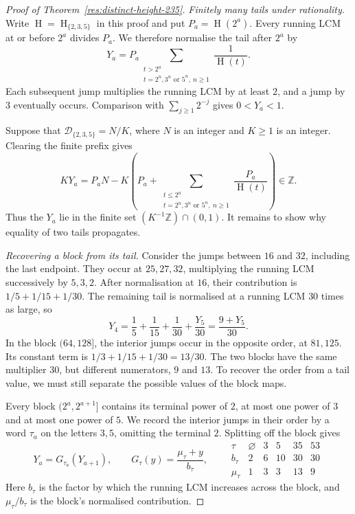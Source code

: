 \documentclass[11pt]{article}
\newcommand{\hgt}{\operatorname{H}}
\begin{document}
\begin{proof}[Proof of Theorem~\ref{res:distinct-height-235}]
\emph{Finitely many tails under rationality.}
Write $\hgt=\hgt_{\{2,3,5\}}$ in this proof and put $P_a=\hgt(2^a)$.
Every running LCM at or before $2^a$ divides $P_a$. We therefore normalise
the tail after $2^a$ by
\begin{equation}\label{eq:five-tail}
 Y_a=P_a\sum_{\substack{t>2^a\\t=2^n,3^n\text{ or }5^n,\ n\ge1}}
                   \frac1{\hgt(t)}.
\end{equation}
Each subsequent jump multiplies the running LCM by at least $2$, and a jump
by $3$ eventually occurs. Comparison with $\sum_{j\ge1}2^{-j}$ gives
$0<Y_a<1$.

Suppose that $\mathcal D_{\{2,3,5\}}=N/K$, where $N$ is an integer and
$K\ge1$ is an integer. Clearing the finite prefix gives
\[
 KY_a=P_aN-K\left(P_a+
        \sum_{\substack{t\le2^a\\t=2^n,3^n\text{ or }5^n,\ n\ge1}}
                 \frac{P_a}{\hgt(t)}\right)\in\mathbb Z.
\]
Thus the $Y_a$ lie in the finite set $(K^{-1}\mathbb Z)\cap(0,1)$.
It remains to show why equality of two tails propagates.

\medskip
\emph{Recovering a block from its tail.}
Consider the jumps between $16$ and $32$, including the last endpoint.
They occur at $25,27,32$, multiplying the running LCM successively by $5,3,2$.
After normalisation at $16$, their contribution is
$1/5+1/15+1/30$. The remaining tail is normalised at a running LCM $30$
times as large, so
\[
 Y_4=\frac15+\frac1{15}+\frac1{30}+\frac{Y_5}{30}
     =\frac{9+Y_5}{30}.
\]
In the block $(64,128]$, the interior jumps occur in the opposite order,
at $81,125$. Its constant term is $1/3+1/15+1/30=13/30$.
The two blocks have the same multiplier $30$, but different numerators,
$9$ and $13$. To recover the order from a tail value, we must still
separate the possible values of the block maps.

Every block $(2^a,2^{a+1}]$ contains its terminal power of $2$, at most
one power of $3$ and at most one power of $5$. We record the interior
jumps in their order by a word $\tau_a$ on the letters $3,5$, omitting
the terminal $2$. Splitting off the block gives
\begin{equation}\label{eq:five-maps}
 Y_a=G_{\tau_a}(Y_{a+1}),\qquad
 G_\tau(y)=\frac{\mu_\tau+y}{b_\tau},\qquad
 \begin{array}{c|ccccc}
 \tau&\varnothing&3&5&35&53\\\hline
 b_\tau&2&6&10&30&30\\
 \mu_\tau&1&3&3&13&9
 \end{array}
\end{equation}
Here $b_\tau$ is the factor by which the running LCM increases across the
block, and $\mu_\tau/b_\tau$ is the block's normalised contribution.


\end{proof}
\end{document}
